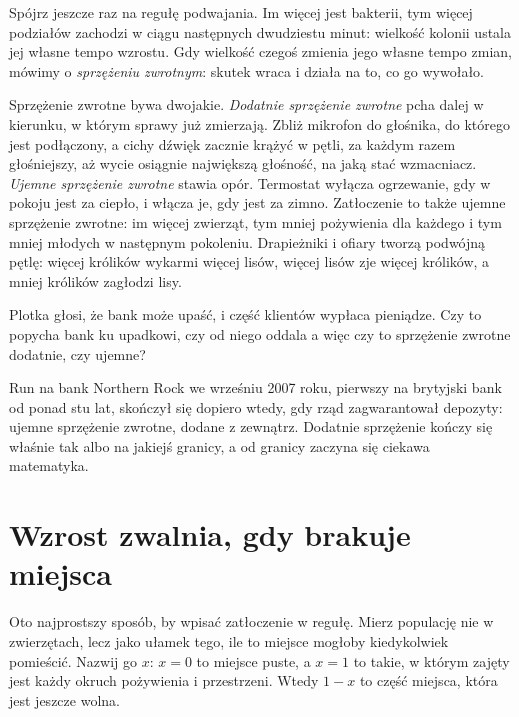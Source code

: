 \noindent
Spójrz jeszcze raz na regułę podwajania. Im więcej jest bakterii, tym więcej
podziałów zachodzi w ciągu następnych dwudziestu minut: wielkość kolonii
ustala jej własne tempo wzrostu. Gdy wielkość czegoś zmienia jego własne
tempo zmian, mówimy o \emph{sprzężeniu zwrotnym}: skutek wraca i działa na
to, co go wywołało.

Sprzężenie zwrotne bywa dwojakie. \emph{Dodatnie sprzężenie zwrotne} pcha
dalej w kierunku, w którym sprawy już zmierzają. Zbliż mikrofon do głośnika,
do którego jest podłączony, a cichy dźwięk zacznie krążyć w pętli, za każdym
razem głośniejszy, aż wycie osiągnie największą głośność, na jaką stać
wzmacniacz. \emph{Ujemne sprzężenie zwrotne} stawia opór. Termostat wyłącza
ogrzewanie, gdy w pokoju jest za ciepło, i włącza je, gdy jest za zimno.
Zatłoczenie to także ujemne sprzężenie zwrotne: im więcej zwierząt, tym mniej
pożywienia dla każdego i tym mniej młodych w następnym pokoleniu. Drapieżniki
i ofiary tworzą podwójną pętlę: więcej królików wykarmi więcej lisów, więcej
lisów zje więcej królików, a mniej królików zagłodzi lisy.


\begin{think}
Plotka głosi, że bank może upaść, i część klientów wypłaca pieniądze. Czy to
popycha bank ku upadkowi, czy od niego oddala \dash{} a więc czy to
sprzężenie zwrotne dodatnie, czy ujemne?
\end{think}
Run na bank Northern Rock we wrześniu 2007 roku, pierwszy na brytyjski bank
od ponad stu lat, skończył się dopiero wtedy, gdy rząd zagwarantował
depozyty: ujemne sprzężenie zwrotne, dodane z zewnątrz. Dodatnie sprzężenie
kończy się właśnie tak albo na jakiejś granicy, a od granicy zaczyna się
ciekawa matematyka.

\section{Wzrost zwalnia, gdy brakuje miejsca}
\label{sec:ch03-logistic}

\noindent
Oto najprostszy sposób, by wpisać zatłoczenie w regułę. Mierz populację nie
w zwierzętach, lecz jako ułamek tego, ile to miejsce mogłoby kiedykolwiek
pomieścić. Nazwij go $x$: $x = 0$ to miejsce puste, a $x = 1$ to takie, w
którym zajęty jest każdy okruch pożywienia i przestrzeni. Wtedy $1 - x$ to
część miejsca, która jest jeszcze wolna.


